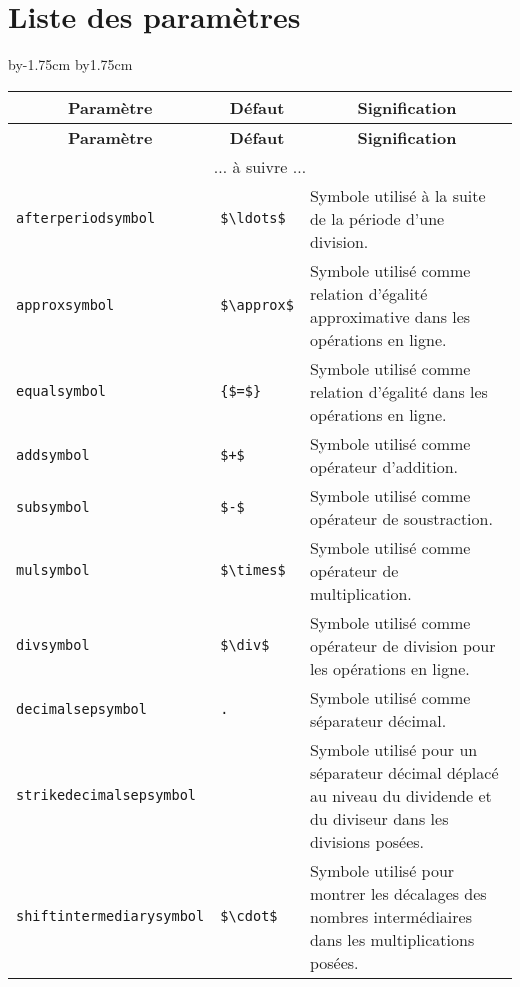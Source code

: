 \documentclass[12pt]{report}
\begin{document}
\section{Liste des paramètres}
\label{sec:Liste des parametres}
%
\begingroup
\advance\hoffset by-1.75cm \advance\linewidth by1.75cm
\begin{longtable}{|l|l|p{7cm}|}
  \hline
  \multicolumn{1}{|c|}{\textbf{Paramètre}} &
  \multicolumn{1}{c|}{\textbf{Défaut}} &
  \multicolumn{1}{c|}{\textbf{Signification}} \\\hline\hline
  \endfirsthead
  \hline
  \multicolumn{1}{|c|}{\textbf{Paramètre}} &
  \multicolumn{1}{c|}{\textbf{Défaut}} &
  \multicolumn{1}{c|}{\textbf{Signification}} \\\hline\hline
  \endhead
  \hline
  \multicolumn{3}{|c|}{$\ldots$ à suivre $\ldots$}\\
  \hline
  \endfoot
  \hline
  \endlastfoot
  \verb+afterperiodsymbol+ &
  \verb+$\ldots$+ &
  Symbole utilisé à la suite de la période d'une division. \\\hline
  \verb+approxsymbol+ &
  \verb+$\approx$+ &
  Symbole utilisé comme relation d'égalité approximative dans les
  opérations en ligne. \\\hline
  \verb+equalsymbol+ &
  \verb+{$=$}+ &
  Symbole utilisé comme relation d'égalité dans les opérations en
  ligne. \\\hline
  \verb+addsymbol+ &
  \verb-$+$- &
  Symbole utilisé comme opérateur d'addition. \\\hline
  \verb+subsymbol+ &
  \verb+$-$+ &
  Symbole utilisé comme opérateur de soustraction. \\\hline
  \verb+mulsymbol+ &
  \verb+$\times$+ &
  Symbole utilisé comme opérateur de  multiplication. \\\hline
  \verb+divsymbol+ &
  \verb+$\div$+ &
  Symbole utilisé comme opérateur de division pour les opérations en
  ligne. \\\hline
  \verb+decimalsepsymbol+ &
  \verb+.+ &
  Symbole utilisé comme séparateur décimal. \\\hline
  \verb+strikedecimalsepsymbol+ &
  &
  Symbole utilisé pour un séparateur décimal déplacé au niveau du
  dividende et du diviseur dans les divisions posées. \\\hline
  \verb+shiftintermediarysymbol+ &
  \verb+$\cdot$+ &
  Symbole utilisé pour montrer les décalages des nombres
  intermédiaires dans les multiplications posées. \\\hline

\end{longtable}
\end{document}

